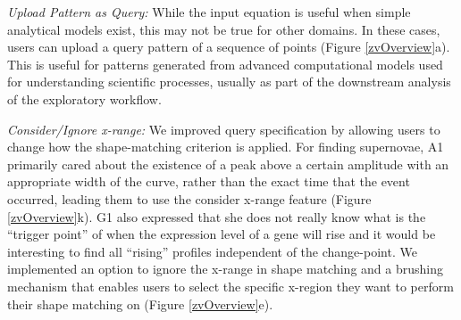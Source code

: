 \par \textit{Upload Pattern as Query:} While the input equation is useful when simple analytical models exist, this may not be true for other domains. In these cases, users can upload a query pattern of a sequence of points (Figure \ref{zvOverview}a). This is useful for patterns generated from advanced computational models used for understanding scientific processes, usually as part of the downstream analysis of the exploratory workflow. %
\par \textit{Consider/Ignore x-range:} We improved query specification by allowing users to change how the shape-matching criterion is applied. For finding supernovae, A1 primarily cared about the existence of a peak above a certain amplitude with an appropriate width of the curve, rather than the exact time that the event occurred, leading them to use the consider x-range feature (Figure \ref{zvOverview}k). G1 also expressed that she does not really know what is the ``trigger point'' of when the expression level of a gene will rise and it would be interesting to find all ``rising'' profiles independent of the change-point.  We implemented an option to ignore the x-range in shape matching and a brushing mechanism that enables users to select the specific x-region they want to perform their shape matching on (Figure \ref{zvOverview}e). 
